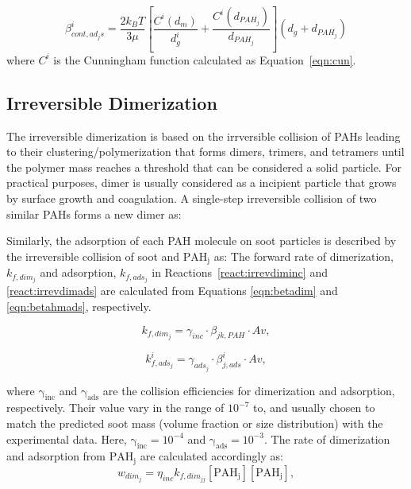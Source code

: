 \begin{equation}
	\beta^i_{cont, ad_js}=
	\frac{2 k_B T}{3 \mu}
	\left[
	\frac{C^i\left(d_m\right)}{d^i_g}+
	\frac{C^i\left(d_{PAH_j}\right)}{d_{PAH_j}}
	\right]
	\left(d_g+d_{PAH_j}\right)
	\label{eqn:betacontads}
\end{equation}
where $C^i$ is the Cunningham function calculated as Equation~\eqref{eqn:cun}.
\subsection{Irreversible Dimerization}

The irreversible dimerization is based on the irrversible collision of PAHs leading to their clustering/polymerization that forms dimers, trimers, and tetramers until the polymer mass reaches a threshold that can be considered a solid particle. For practical purposes, dimer is usually considered as a incipient particle that grows by surface growth and coagulation. A single-step irreversible collision of two similar PAHs forms a new dimer as:

Similarly, the adsorption of each PAH molecule on soot particles is described by the irreversible collision of soot and $\mathrm{PAH_j}$ as:
The forward rate of dimerization, ${k_{f,dim_j}}$ and adsorption, $k_{f,ads_j}$ in Reactions~\eqref{react:irrevdiminc} and \eqref{react:irrevdimads} are calculated from Equations \eqref{eqn:betadim} and \eqref{eqn:betahmads}, respectively.

\begin{equation}
	k_{f,dim_j}=
	\gamma_{inc}\cdot\beta_{jk,PAH}\cdot Av
	\label{eqn:kfdim},
\end{equation}

\begin{equation}
	k^i_{f,ads_j}=
	\gamma_{ads_j}\cdot\beta^i_{j,ads}\cdot Av
	\label{eqn:kfads},
\end{equation}

where $\mathrm{\gamma_{inc}}$ and $\mathrm{\gamma_{ads}}$ are the collision efficiencies for dimerization and adsorption, respectively. Their value vary in the range of $\mathrm{10^{-7}}$ to, and usually chosen to match the predicted soot mass (volume fraction or size distribution) with the experimental data. Here, $\mathrm{\gamma_{inc}}=10^{-4}$ and $\mathrm{\gamma_{ads}=10^{-3}}$. The rate of dimerization and adsorption from $\mathrm{PAH_j}$ are calculated accordingly as:
\begin{equation}
	w_{dim_j} = \eta_{inc} k_{f,dim_{jj}} [\mathrm{PAH_j}] [\mathrm{PAH_j}],
\end{equation}

